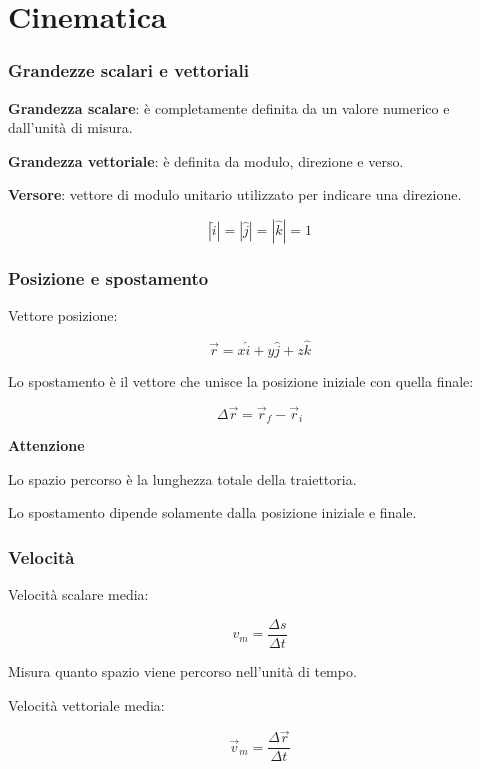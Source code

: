 \chapter{Cinematica}

\subsection{Grandezze scalari e vettoriali}

\textbf{Grandezza scalare}: è completamente definita da un valore numerico e dall'unità di misura.

\noindent\textbf{Grandezza vettoriale}: è definita da modulo, direzione e verso.

\noindent\textbf{Versore}: vettore di modulo unitario utilizzato per indicare una direzione.

\[
|\hat{i}|=|\hat{j}|=|\hat{k}|=1
\]

\vspace{0.3cm}

\subsection{Posizione e spostamento}

Vettore posizione:

\[
\vec{r}=x\hat{i}+y\hat{j}+z\hat{k}
\]

\noindent Lo spostamento è il vettore che unisce la posizione iniziale con quella finale:

\[
\Delta \vec{r}=\vec{r}_f-\vec{r}_i
\]

\noindent\textbf{Attenzione}

\noindent Lo spazio percorso è la lunghezza totale della traiettoria.

\noindent Lo spostamento dipende solamente dalla posizione iniziale e finale.

\vspace{0.3cm}

\subsection{Velocità}

Velocità scalare media:

\[
v_m=\frac{\Delta s}{\Delta t}
\]

\noindent Misura quanto spazio viene percorso nell'unità di tempo.

\noindent Velocità vettoriale media:

\[
\vec{v}_m=\frac{\Delta \vec{r}}{\Delta t}
\]

